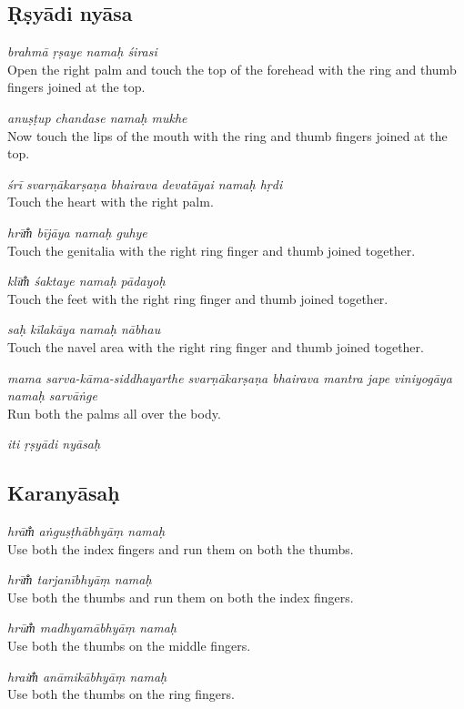 \documentclass[12pt,oneside,a4paper]{article}
\newenvironment{shloka}[1]
  {\bigskip\center#1\varwidth{\linewidth}}
  {\endvarwidth\endcenter\bigskip}
\newcommand{\tl}[1]{\emph{#1}}
\begin{document}
\subsection{Ṛṣyādi nyāsa}

\tl{brahmā ṛṣaye namaḥ śirasi}\\
Open the right palm and touch the top of the forehead with the ring and thumb
fingers joined at the top.

\tl{anuṣṭup chandase namaḥ mukhe}\\
Now touch the lips of the mouth with the ring and thumb fingers joined
at the top.

\tl{śrī svarṇākarṣaṇa bhairava devatāyai namaḥ hṛdi}\\
Touch the heart with the right palm.

\tl{hrīm̐ bījāya namaḥ guhye}\\
Touch the genitalia with the right ring finger and thumb joined together.

\tl{klīm̐ śaktaye namaḥ pādayoḥ}\\
Touch the feet with the right ring finger and thumb joined together.

\tl{saḥ kīlakāya namaḥ nābhau}\\
Touch the navel area with the right ring finger and thumb joined together.

\tl{mama sarva-kāma-siddhayarthe svarṇākarṣaṇa bhairava mantra jape viniyogāya
namaḥ sarvāṅge}\\
Run both the palms all over the body.

\begin{shloka}\itshape
  iti ṛṣyādi nyāsaḥ
\end{shloka}

\subsection{Karanyāsaḥ}

\tl{hrām̐ aṅguṣṭhābhyāṃ namaḥ}\\
Use both the index fingers and run them on both the thumbs.

\tl{hrīm̐ tarjanībhyāṃ namaḥ}\\
Use both the thumbs and run them on both the index fingers.

\tl{hrūm̐ madhyamābhyāṃ namaḥ}\\
Use both the thumbs on the middle fingers.

\tl{hraim̐ anāmikābhyāṃ namaḥ}\\
Use both the thumbs on the ring fingers.
\end{document}
